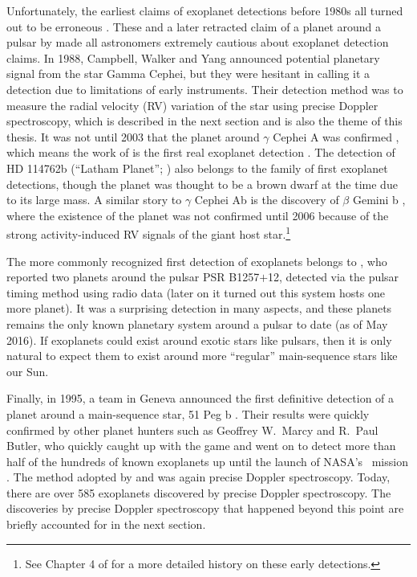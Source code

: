 Unfortunately, the earliest claims of exoplanet detections before
1980s all turned out to be erroneous \citep{1855MNRAS..15..228J,
1969AJ.....74..757V}. These and a later retracted claim of a planet
around a pulsar by \cite{1991Natur.352..311B} made all astronomers
extremely cautious about exoplanet detection claims. In 1988,
Campbell, Walker and Yang announced potential planetary signal from
the star Gamma Cephei, but they were hesitant in calling it a
detection due to limitations of early instruments. Their detection
method was to measure the radial velocity (RV) variation of the star
using precise Doppler spectroscopy, which is described in the next
section and is also the theme of this thesis.  It was not until 2003
that the planet around $\gamma$ Cephei A was confirmed
\citep{2003ApJ...599.1383H}, which means the work of
\cite{1988ApJ...331..902C} is the first real exoplanet detection
. The detection of HD 114762b (``Latham
Planet''; \citealt{1989Natur.339...38L}) also belongs to the family of
first exoplanet detections, though the planet was thought to be a
brown dwarf at the time due to its large mass. A similar story to
$\gamma$ Cephei Ab is the discovery of $\beta$ Gemini b
\citep{1993ApJ...413..339H}, where the existence of the planet was not
confirmed until 2006 \citep{2006A&A...457..335H} because of the strong
activity-induced RV signals of the giant host star.\footnote{See
Chapter 4 of \cite{2013pss3.book..489W} for a more detailed history on
these early detections.}

The more commonly recognized first detection of exoplanets belongs to
\cite{1992Natur.355..145W}, who reported two planets around the pulsar
PSR B1257$+$12, detected via the pulsar timing method using radio data
(later on it turned out this system hosts one more planet). It was a
surprising detection in many aspects, and these planets remains the
only known planetary system around a pulsar to date (as of May
2016). If exoplanets could exist around exotic stars like pulsars,
then it is only natural to expect them to exist around more
``regular'' main-sequence stars like our Sun.

Finally, in 1995, a team in Geneva announced the first definitive
detection of a planet around a main-sequence star, 51 Peg b
\citep{1995Natur.378..355M}. Their results were quickly confirmed by
other planet hunters such as Geoffrey W.\ Marcy and R.\ Paul Butler,
who quickly caught up with the game \citep{1996ApJ...464L.153B} and
went on to detect more than half of the hundreds of known exoplanets
up until the launch of NASA's \kepler\ mission
\cite{2010Sci...327..977B}. The method adopted by
\cite{1995Natur.378..355M} and \cite{1996ApJ...464L.153B} was again
precise Doppler spectroscopy. Today, there are over 585 exoplanets
discovered by precise Doppler spectroscopy. The discoveries by precise
Doppler spectroscopy that happened beyond this point are briefly
accounted for in the next section. 

